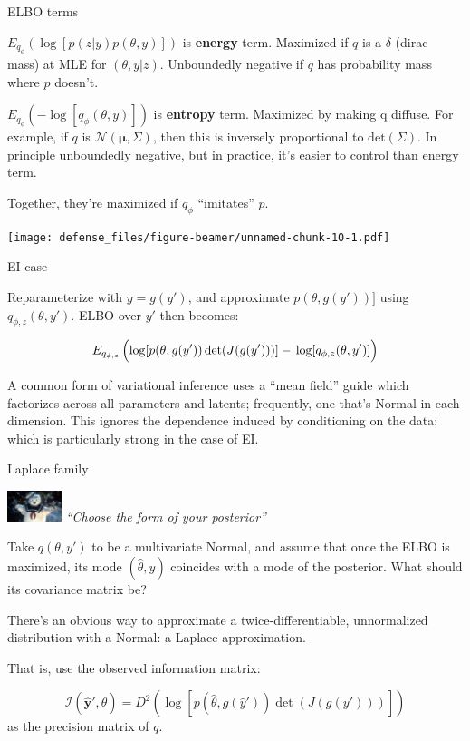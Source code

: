 \documentclass[ignorenonframetext,]{beamer}
\begin{document}
\begin{frame}{ELBO terms}

\(E_{q_\phi}\left(\log[p(z|y)p(\theta,y)]\right)\) is \textbf{energy}
term. Maximized if \(q\) is a \(\delta\) (dirac mass) at MLE for
\((\theta,y|z)\). Unboundedly negative if \(q\) has probability mass
where \(p\) doesn't.

\(E_{q_\phi}\left(-\log[q_\phi(\theta,y)]\right)\) is \textbf{entropy}
term. Maximized by making q diffuse. For example, if \(q\) is
\(\mathcal{N}(\bm{\mu},\Sigma)\), then this is inversely proportional to
\(\mathrm{det}(\Sigma)\). In principle unboundedly negative, but in
practice, it's easier to control than energy term.

Together, they're maximized if \(q_\phi\) ``imitates'' \(p\).

\texttt{[image: defense\_files/figure-beamer/unnamed-chunk-10-1.pdf]}

\end{frame}

\begin{frame}{EI case}

Reparameterize with \(y=g(y')\), and approximate \(p(\theta,g(y'))]\)
using \(q_{\phi,z}(\theta,y')\). ELBO over \(y'\) then becomes:

\[E_{q_{\phi,z}}\left(\log[p(\theta,g(y'))\operatorname{det}(J(g(y')))]-\vphantom{\Big|}\log
[q_{\phi,z}(\theta,y')]\right)\]

A common form of variational inference uses a ``mean field'' guide which
factorizes across all parameters and latents; frequently, one that's
Normal in each dimension. This ignores the dependence induced by
conditioning on the data; which is particularly strong in the case of
EI.

\end{frame}

\begin{frame}{Laplace family}

\includegraphics[width=60px]{stay_puft_2} \emph{``Choose the form of
your posterior''}

Take \(q(\theta,y')\) to be a multivariate Normal, and assume that once
the ELBO is maximized, its mode \((\hat{\theta},\hat{y})\) coincides
with a mode of the posterior. What should its covariance matrix be?

There's an obvious way to approximate a twice-differentiable,
unnormalized distribution with a Normal: a Laplace approximation.

That is, use the observed information matrix:

\[\mathscr{I}(\hat{\bm{y}}',\hat{\theta})=D^2\left(\log[p(\hat{\theta},g(\hat{y}'))\operatorname{det}(J(g(y')))]\right)\]
as the precision matrix of \(q\).

\end{frame}
\end{document}
